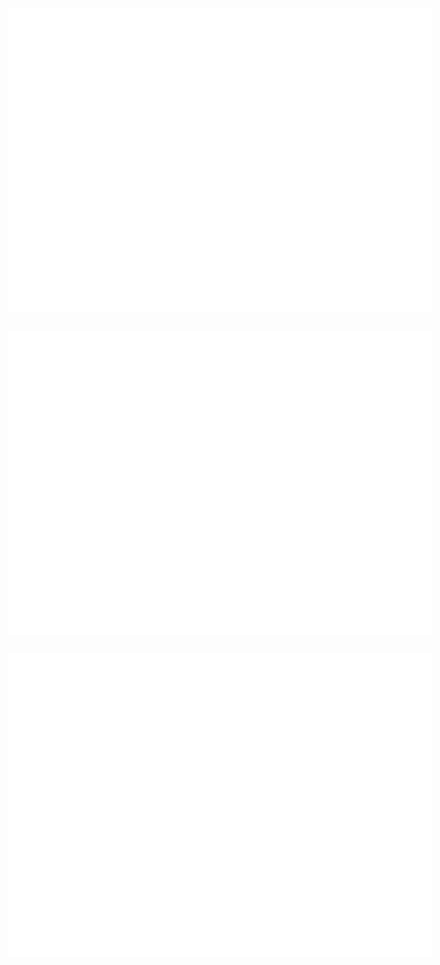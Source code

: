 \begin{figure}[H]
\centering
  \begin{minipage}{0.3\textwidth}
    \includegraphics[width=\textwidth]{images/dummy.png}
    \label{a)}
  \end{minipage}
  \begin{minipage}{0.3\textwidth}
    \includegraphics[width=\textwidth]{images/dummy.png}
    \label{b)}
  \end{minipage}
  \begin{minipage}{0.3\textwidth}
    \includegraphics[width=\textwidth]{images/dummy.png}

\end{minipage}
\end{figure}
